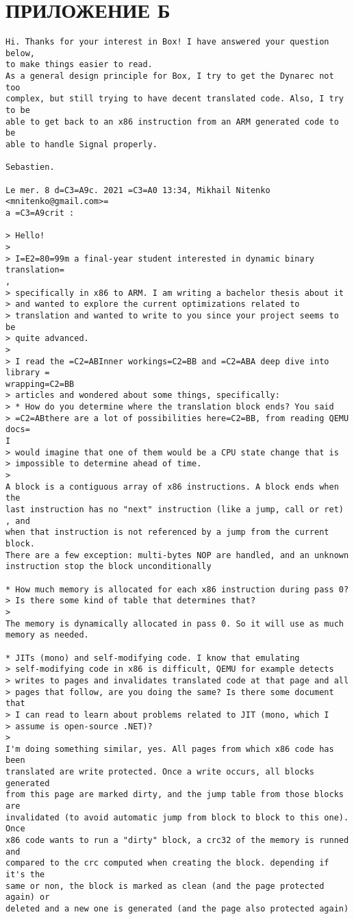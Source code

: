 \section*{ПРИЛОЖЕНИЕ Б}

\begin{Verbatim}[fontsize=\footnotesize]
Hi. Thanks for your interest in Box! I have answered your question below,
to make things easier to read.
As a general design principle for Box, I try to get the Dynarec not too
complex, but still trying to have decent translated code. Also, I try to be
able to get back to an x86 instruction from an ARM generated code to be
able to handle Signal properly.

Sebastien.

Le mer. 8 d=C3=A9c. 2021 =C3=A0 13:34, Mikhail Nitenko <mnitenko@gmail.com>=
a =C3=A9crit :

> Hello!
>
> I=E2=80=99m a final-year student interested in dynamic binary translation=
,
> specifically in x86 to ARM. I am writing a bachelor thesis about it
> and wanted to explore the current optimizations related to
> translation and wanted to write to you since your project seems to be
> quite advanced.
>
> I read the =C2=ABInner workings=C2=BB and =C2=ABA deep dive into library =
wrapping=C2=BB
> articles and wondered about some things, specifically:
> * How do you determine where the translation block ends? You said
> =C2=ABthere are a lot of possibilities here=C2=BB, from reading QEMU docs=
I
> would imagine that one of them would be a CPU state change that is
> impossible to determine ahead of time.
>
A block is a contiguous array of x86 instructions. A block ends when the
last instruction has no "next" instruction (like a jump, call or ret) , and
when that instruction is not referenced by a jump from the current block.
There are a few exception: multi-bytes NOP are handled, and an unknown
instruction stop the block unconditionally

* How much memory is allocated for each x86 instruction during pass 0?
> Is there some kind of table that determines that?
>
The memory is dynamically allocated in pass 0. So it will use as much
memory as needed.

* JITs (mono) and self-modifying code. I know that emulating
> self-modifying code in x86 is difficult, QEMU for example detects
> writes to pages and invalidates translated code at that page and all
> pages that follow, are you doing the same? Is there some document that
> I can read to learn about problems related to JIT (mono, which I
> assume is open-source .NET)?
>
I'm doing something similar, yes. All pages from which x86 code has been
translated are write protected. Once a write occurs, all blocks generated
from this page are marked dirty, and the jump table from those blocks are
invalidated (to avoid automatic jump from block to block to this one). Once
x86 code wants to run a "dirty" block, a crc32 of the memory is runned and
compared to the crc computed when creating the block. depending if it's the
same or non, the block is marked as clean (and the page protected again) or
deleted and a new one is generated (and the page also protected again)


\end{Verbatim}
